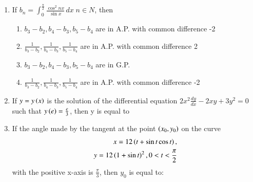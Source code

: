 \documentclass[journal,,12pt,onecolumn]{IEEEtran}
\theoremstyle{remark}
\begin{document}
\begin{enumerate}
\begin{enumerate}
\end{enumerate}
\bigskip
\item If $b_n = \int_{0}^{\frac{\pi}{2}} \frac{\cos^2{nx}}{\sin{x}}\,dx\;n \in N$, then
\begin{enumerate}
    \item $b_3-b_2,b_4-b_3,b_5-b_4$ are in A.P. with common difference -2
    \item $\frac{1}{b_3-b_2},\frac{1}{b_4-b_3},\frac{1}{b_5-b_4}$ are in A.P. with common difference 2
    \item $b_3-b_2,b_4-b_3,b_5-b_4$ are in G.P.
    \item $\frac{1}{b_3-b_2},\frac{1}{b_4-b_3},\frac{1}{b_5-b_4}$ are in A.P. with common difference -2
\end{enumerate}
\bigskip
\item If $y=y\left(x\right)$ is the solution of the differential equation $2x^2\frac{dy}{dx}-2xy+3y^2=0$ such that $y\left(e\right)=\frac{e}{3}$, then y is equal to
\begin{enumerate}
\end{enumerate}
\bigskip
\item If the angle made by the tangent at the point $\left(x_0,y_0\right)$ on the curve 
\begin{align*}
    x=12\left(t+\sin{t}\cos{t}\right),\\
    y=12\left(1+\sin{t}\right)^2, 0<t<\frac{\pi}{2}
\end{align*}
with the positive x-axis is $\frac{\pi}{3}$, then $y_0$ is equal to:
\begin{enumerate}


\end{enumerate}
\end{enumerate}
\end{document}
